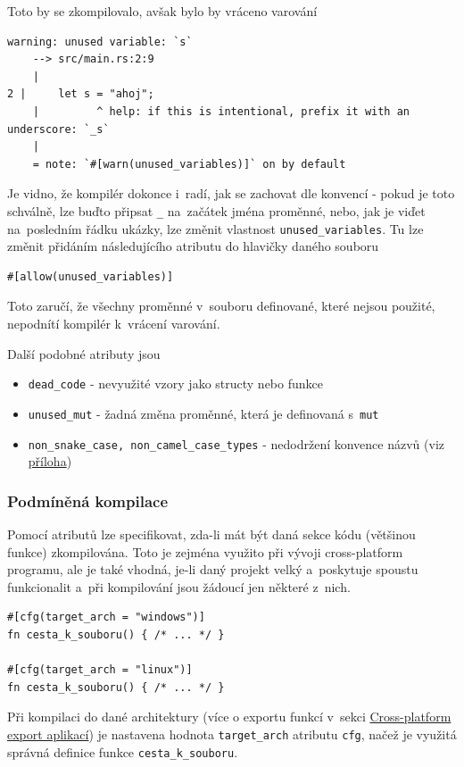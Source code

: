 \documentclass[a4paper, 12pt]{article} %
\newcommand{\rust}[1]{\texttt{#1}}
\begin{document}
			Toto by se zkompilovalo, avšak bylo by vráceno varování
			\begin{verbatim}
warning: unused variable: `s`
	--> src/main.rs:2:9
	|
2 |     let s = "ahoj";
	|         ^ help: if this is intentional, prefix it with an underscore: `_s`
	|
	= note: `#[warn(unused_variables)]` on by default
			\end{verbatim}
			
			Je vidno, že kompilér dokonce i~radí, jak se zachovat dle konvencí - pokud je toto schválně, lze buďto připsat \rust{_} na~začátek jména proměnné, nebo, jak je viďet na~posledním řádku ukázky, lze změnit vlastnost \rust{unused_variables}. Tu lze změnit přidáním následujícího atributu do hlavičky daného souboru
			\begin{verbatim}
#[allow(unused_variables)]
			\end{verbatim}
			
			Toto zaručí, že všechny proměnné v~souboru definované, které nejsou použité, nepodnítí kompilér k~vrácení varování.
			
			Další podobné atributy jsou
			\begin{itemize}
				\item \rust{dead_code} - nevyužité vzory jako structy nebo funkce
				\item \rust{unused_mut} - žadná změna proměnné, která je definovaná s~\rust{mut}
				\item \rust{non_snake_case, non_camel_case_types} - nedodržení konvence názvů (viz \hyperlink{konvence_nazvu}{příloha})
			\end{itemize}

		\subsubsection*{Podmíněná kompilace}
			Pomocí atributů lze specifikovat, zda-li mát být daná sekce kódu (většinou funkce) zkompilována. Toto je zejména využito při vývoji cross-platform programu, ale je také vhodná, je-li daný projekt velký a~poskytuje spoustu funkcionalit a~při kompilování jsou žádoucí jen některé z~nich.
			\begin{verbatim}
#[cfg(target_arch = "windows")]
fn cesta_k_souboru() { /* ... */ }

#[cfg(target_arch = "linux")]
fn cesta_k_souboru() { /* ... */ }
			\end{verbatim}
			
			Při kompilaci do dané architektury (více o exportu funkcí v~sekci \hyperlink{cross-platform}{Cross-platform export aplikací}) je nastavena hodnota \rust{target_arch} atributu \rust{cfg}, načež je využitá správná definice funkce \rust{cesta_k_souboru}.
			
\end{document}
